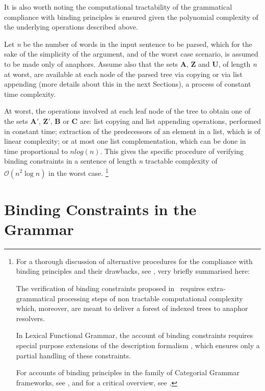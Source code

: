 \documentclass[output=paper
,modfonts
,nonflat]{langsci/langscibook}
\begin{document}
It is also worth noting the computational
tractability of the grammatical compliance with binding principles
is ensured given the polynomial complexity of the underlying operations
described above. 

Let {\it n} be
the number of words in the input sentence to be parsed, which for the
sake of the simplicity of the argument, and of the worst case scenario, 
is assumed to be made only of anaphors. 
Assume also that the sets \textbf{A}, \textbf{Z} and \textbf{U}, of length {\it n} at worst, 
are available at each node of the parsed tree via copying or via list appending 
(more details about this in
the next Sections), a process of constant time complexity. 

At worst, the operations involved at each
leaf node of the tree to obtain one of the sets \textbf{A$'$}, \textbf{Z$'$}, \textbf{B} or \textbf{C} are:
list copying and list appending operations, performed in constant time; extraction
of the predecessors of an element in a list, which is of linear complexity;
or at most one list complementation, which can be
done in time proportional to $n log(n)$. This gives
the specific procedure of verifying binding constraints in a sentence
of length {\it n} tractable complexity of $\mathcal{O}(n^2\log{}n)$ in the worst case.%
%
\footnote{
For a thorough discussion of alternative procedures for the compliance
with binding principles and their drawbacks, see \citep{branco:esslli2000}, very briefly summarised here:

The verification of binding constraints proposed in~\citep{chom:bind80,chom:lect81} requires extra-grammatical processing
steps of non tractable computational complexity \citep{correa:bind88, fong:index90} which, moreover, 
are meant to deliver a forest of indexed
trees to anaphor resolvers. 

In Lexical Functional Grammar, the account of binding constraints requires special purpose 
extensions of the description
formalism \citep{dal:bind93}, which ensures only a partial handling
of these constraints.

For accounts of binding principles in  the family of Categorial Grammar frameworks, 
see \citep{szabol:89, hepple:90, morrill:2000}, 
and for a critical overview, see \citep{jaeger:2001}.
}

\section{Binding Constraints in the Grammar\label{spec1}}
\end{document}

